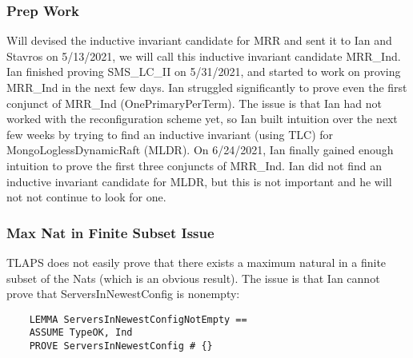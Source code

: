 \documentclass[12pt]{article}
\begin{document}
\subsubsection{Prep Work}
Will devised the inductive invariant candidate for MRR and sent it to Ian and Stavros on 5/13/2021, we will call this inductive invariant candidate MRR\_Ind.  Ian finished proving SMS\_LC\_II on 5/31/2021, and started to work on proving MRR\_Ind in the next few days.  Ian struggled significantly to prove even the first conjunct of MRR\_Ind (OnePrimaryPerTerm).  The issue is that Ian had not worked with the reconfiguration scheme yet, so Ian built intuition over the next few weeks by trying to find an inductive invariant (using TLC) for MongoLoglessDynamicRaft (MLDR).  On 6/24/2021, Ian finally gained enough intuition to prove the first three conjuncts of MRR\_Ind.  Ian did not find an inductive invariant candidate for MLDR, but this is not important and he will not not continue to look for one.  

\subsubsection{Max Nat in Finite Subset Issue}
TLAPS does not easily prove that there exists a maximum natural in a finite subset of the Nats (which is an obvious result).  The issue is that Ian cannot prove that ServersInNewestConfig is nonempty:
\begin{verbatim}
	LEMMA ServersInNewestConfigNotEmpty ==
	ASSUME TypeOK, Ind
	PROVE ServersInNewestConfig # {}
\end{verbatim}
\end{document}
